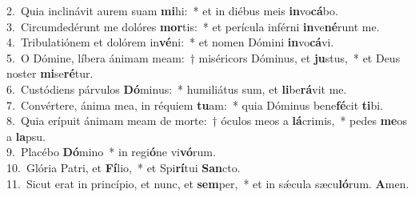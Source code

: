 {2.~}Quia inclinávit aurem suam \textbf{mi}hi:~* et in diébus meis \textbf{in}vo\textbf{cá}bo.\\
{3.~}Circumdedérunt me dolóres \textbf{mor}tis:~* et perícula inférni \textbf{in}ve\textbf{né}runt me.\\
{4.~}Tribulatiónem et dolórem in\textbf{vé}ni:~* et nomen Dómini \textbf{in}vo\textbf{cá}vi.\\
{5.~}O Dómine, líbera ánimam meam:~† miséricors Dóminus, et \textbf{ju}stus,~* et Deus noster \textbf{mi}se\textbf{ré}tur.\\
{6.~}Custódiens párvulos \textbf{Dó}minus:~* humiliátus sum, et \textbf{li}be\textbf{rá}vit me.\\
{7.~}Convértere, ánima mea, in réquiem \textbf{tu}am:~* quia Dóminus bene\textbf{fé}cit \textbf{ti}bi.\\
{8.~}Quia erípuit ánimam meam de morte:~† óculos meos a \textbf{lá}crimis,~* pedes \textbf{me}os a \textbf{la}psu.\\
{9.~}Placébo \textbf{Dó}mino~* in regi\textbf{ó}ne vi\textbf{vó}rum.\\
{10.~}Glória Patri, et \textbf{Fí}lio,~* et Spi\textbf{rí}tui \textbf{San}cto.\\
{11.~}Sicut erat in princípio, et nunc, et \textbf{sem}per,~* et in sǽcula sæcu\textbf{ló}rum. \textbf{A}men.\\

